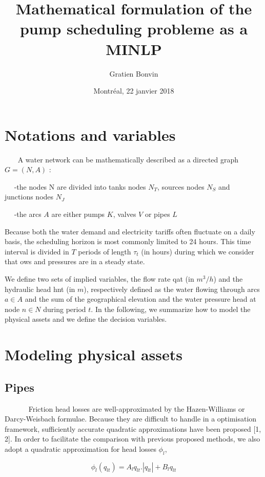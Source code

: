 \documentclass{article}
\title{Mathematical formulation of the pump scheduling probleme as a MINLP}
\author{Gratien Bonvin}
\date{Montréal, 22 janvier 2018}
\begin{document}
\maketitle

\section{Notations and variables}
~~~ A water network can be mathematically described as a directed graph
$G=(N,A)$ :

~~ -the nodes N are divided into tanks nodes ${N}_{T}$, sources nodes ${N}_{S}$ and
~~ junctions nodes ${N}_{J}$

~~ -the arcs $A$ are either pumps $K$, valves $V$ or pipes $L$

Because both the water demand and electricity tariffs often fluctuate on
a daily basis, the scheduling horizon is most commonly limited to 24 hours.
This time interval is divided in $T$ periods of length $\tau_t$ (in hours) during
which we consider that
ows and pressures are in a steady state.

We define two sets of implied variables, the
flow rate qat (in $m^{3}/h$) and the
hydraulic head hnt (in $m$), respectively defined as the water
flowing through
arcs $a \in A$ and the sum of the geographical elevation and the water pressure
head at node $n \in N$ during period $t$. In the following, we summarize how to
model the physical assets and we define the decision variables.




\section{Modeling physical assets}
\subsection{Pipes}

~~~~~~ Friction head losses are well-approximated by the Hazen-Williams or
Darcy-Weisbach formulae. Because they are difficult to handle in a optimisation
framework, sufficiently accurate quadratic approximations have been
proposed [1, 2]. In order to facilitate the comparison with previous proposed
methods, we also adopt a quadratic approximation for head losses $\phi_l$,

\begin{equation}
\phi_l(q_{lt}) = A_lq_{lt}.\left | q_{lt} \right | + B_lq_{lt}
\end{equation}
\end{document}
